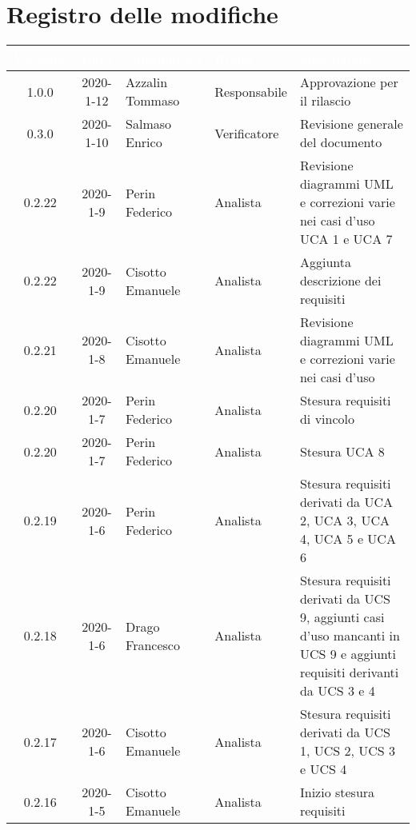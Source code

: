 \section*{Registro delle modifiche}
{
\renewcommand{\arraystretch}{1.5}
\centering
\begin{longtable}{ c c  C{4cm}  C{3cm} C{4cm}}
   \textcolor{white}{\textbf{Versione}} &
   \textcolor{white}{\textbf{Data}}&
   \textcolor{white}{\textbf{Nominativo}}&
   \textcolor{white}{\textbf{Ruolo}}&
   \textcolor{white}{\textbf{Descrizione}}\\
   \endhead


1.0.0 & 2020-1-12 & Azzalin Tommaso & Responsabile & Approvazione per il rilascio \\

0.3.0 & 2020-1-10 & Salmaso Enrico & Verificatore & Revisione generale del documento\\

0.2.22 & 2020-1-9 & Perin Federico & Analista & Revisione diagrammi UML e correzioni varie nei casi d'uso UCA 1 e UCA 7 \\

0.2.22 & 2020-1-9 & Cisotto Emanuele & Analista & Aggiunta descrizione dei requisiti \\

0.2.21 & 2020-1-8 & Cisotto Emanuele & Analista & Revisione diagrammi UML e correzioni varie nei casi d'uso \\

0.2.20 & 2020-1-7 & Perin Federico & Analista & Stesura requisiti di vincolo\\

0.2.20 & 2020-1-7 & Perin Federico & Analista & Stesura UCA 8\\

0.2.19 & 2020-1-6 & Perin Federico & Analista & Stesura requisiti derivati da UCA 2, UCA 3, UCA 4, UCA 5 e UCA 6\\

0.2.18 & 2020-1-6 & Drago Francesco & Analista & Stesura requisiti derivati da UCS 9, aggiunti casi d'uso mancanti in UCS 9 e aggiunti requisiti derivanti da UCS 3 e 4 \\

0.2.17 & 2020-1-6 & Cisotto Emanuele & Analista & Stesura requisiti derivati da UCS 1, UCS 2, UCS 3 e UCS 4 \\

0.2.16 & 2020-1-5 & Cisotto Emanuele & Analista & Inizio stesura requisiti \\


\end{longtable}}

